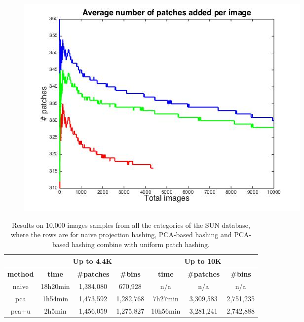  \begin{figure}
\includegraphics[width=1\linewidth]{fig_NN/ave_patches_per_img.jpg}
\caption{}
\label{fig:ave_patches_per_img}
\end{figure}

\begin{table}
\centering
\begin{tabular}{ | c | c | c | c | c | c | c | }
\hline
& \multicolumn{3}{|c|}{Up to 4.4K} & \multicolumn{3}{|c|}{Up to 10K} \\ \hline
\textbf{method} & \textbf{time} & \textbf{\#patches} & \textbf{\#bins} & \textbf{time} & \textbf{\#patches} & \textbf{\#bins}\\
\hline
naive & 18h20min & 1,384,080 & 670,928 & n/a & n/a & n/a \\ \hline
pca & 1h54min & 1,473,592 & 1,282,768 & 7h27min & 3,309,583 & 2,751,235  \\ \hline
pca+u & 2h5min & 1,456,059 & 1,275,827 & 10h56min & 3,281,241 & 2,742,888 \\ \hline
\end{tabular}
\caption{Results on 10,000 images samples from all
the categories of the SUN database, where the rows
are for naive projection hashing, PCA-based hashing and
PCA-based hashing combine with uniform patch hashing.}
\label{tab:nn-res}
\end{table}


